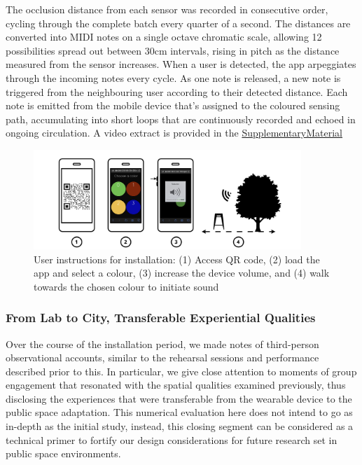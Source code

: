 The occlusion distance from each sensor was recorded in consecutive order, cycling through the complete batch every quarter of a second. The distances are converted into MIDI notes on a single octave chromatic scale, allowing 12 possibilities spread out between 30cm intervals, rising in pitch as the distance measured from the sensor increases. When a user is detected, the app arpeggiates through the incoming notes every cycle. As one note is released, a new note is triggered from the neighbouring user according to their detected distance. Each note is emitted from the mobile device that's assigned to the coloured sensing path, accumulating into short loops that are continuously recorded and echoed in ongoing circulation. A video extract is provided in the \hyperref[SupplementaryMaterial]{SupplementaryMaterial}

\begin{figure}[!h]
\centering
\includegraphics[width=0.9\textwidth,keepaspectratio]{Chapters/Figures/adse_ess/ADSE-WP-INSTRUCTIONS.png}
{
\caption[User instructions for installation]{User instructions for installation: (1) Access QR code, (2) load the app and select a colour, (3) increase the device volume, and (4) walk towards the chosen colour to initiate sound}
\label{fig:installation_instructions}
}
\end{figure}

\subsubsection{From Lab to City, Transferable Experiential Qualities}
\label{sec:fromLabToCity}

Over the course of the installation period, we made notes of third-person observational accounts, similar to the rehearsal sessions and performance described prior to this. In particular, we give close attention to moments of group engagement that resonated with the spatial qualities examined previously, thus disclosing the experiences that were transferable from the wearable device to the public space adaptation. This numerical evaluation here does not intend to go as in-depth as the initial study, instead, this closing segment can be considered as a technical primer to fortify our design considerations for future research set in public space environments.

